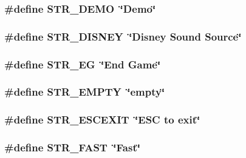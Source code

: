 \label{FOREIGN_8H_a0047673716c48cf2c05d5eb4bb2c71db}
\hypertarget{FOREIGN_8H_a71a63fd8d73733362c05416410fc5c30}{
\subsubsection[{STR\_\-DEMO}]{\setlength{\rightskip}{0pt plus 5cm}\#define STR\_\-DEMO~\char`\"{}Demo\char`\"{}}}
\label{FOREIGN_8H_a71a63fd8d73733362c05416410fc5c30}
\hypertarget{FOREIGN_8H_a60a00828499124d1eedeb7dc43011753}{
\subsubsection[{STR\_\-DISNEY}]{\setlength{\rightskip}{0pt plus 5cm}\#define STR\_\-DISNEY~\char`\"{}Disney Sound Source\char`\"{}}}
\label{FOREIGN_8H_a60a00828499124d1eedeb7dc43011753}
\hypertarget{FOREIGN_8H_ab46c5a5d78a6d539eaf4b74b1db7c11c}{
\subsubsection[{STR\_\-EG}]{\setlength{\rightskip}{0pt plus 5cm}\#define STR\_\-EG~\char`\"{}End Game\char`\"{}}}
\label{FOREIGN_8H_ab46c5a5d78a6d539eaf4b74b1db7c11c}
\hypertarget{FOREIGN_8H_a68eb6ded92ef28a97b3ef52d92c4a775}{
\subsubsection[{STR\_\-EMPTY}]{\setlength{\rightskip}{0pt plus 5cm}\#define STR\_\-EMPTY~\char`\"{}empty\char`\"{}}}
\label{FOREIGN_8H_a68eb6ded92ef28a97b3ef52d92c4a775}
\hypertarget{FOREIGN_8H_a494bddb9606e44a9e85a194ebf80feb8}{
\subsubsection[{STR\_\-ESCEXIT}]{\setlength{\rightskip}{0pt plus 5cm}\#define STR\_\-ESCEXIT~\char`\"{}ESC to exit\char`\"{}}}
\label{FOREIGN_8H_a494bddb9606e44a9e85a194ebf80feb8}
\hypertarget{FOREIGN_8H_abd3a232c8bbf73ee500f7ce9ee855b2f}{
\subsubsection[{STR\_\-FAST}]{\setlength{\rightskip}{0pt plus 5cm}\#define STR\_\-FAST~\char`\"{}Fast\char`\"{}}}
